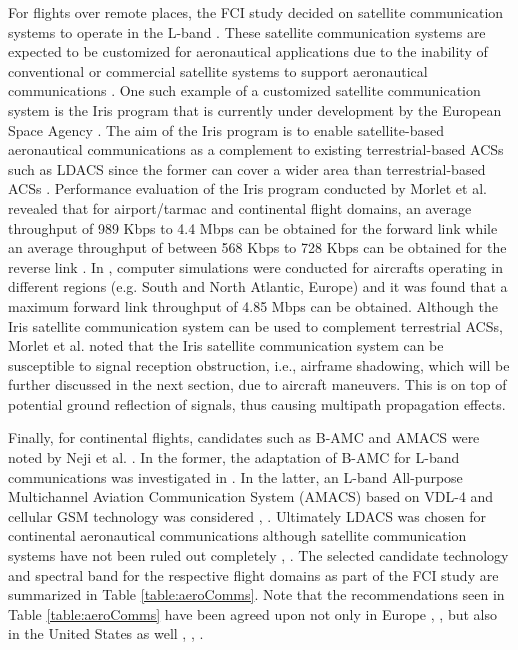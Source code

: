 For flights over remote places, the FCI study decided on satellite communication systems to operate in the L-band \cite{neji2013survey,morlet2011options}. These satellite communication systems are expected to be customized for aeronautical applications due to the inability of conventional or commercial satellite systems to support aeronautical communications \cite{neji2013survey}. One such example of a customized satellite communication system is the Iris program that is currently under development by the European Space Agency \cite{morlet2011options,morlet2010characterisation}. The aim of the Iris program is to enable satellite-based aeronautical communications as a complement to existing terrestrial-based ACSs such as LDACS since the former can cover a wider area than terrestrial-based ACSs \cite{morlet2011options}. Performance evaluation of the Iris program conducted by Morlet et al. \cite{morlet2010characterisation} revealed that for airport/tarmac and continental flight domains, an average throughput of 989 Kbps to 4.4 Mbps can be obtained for the forward link while an average throughput of between 568 Kbps to 728 Kbps can be obtained for the reverse link \cite{morlet2010characterisation}. In \cite{morlet2011options}, computer simulations were conducted for aircrafts operating in different regions (e.g. South and North Atlantic, Europe) and it was found that a maximum forward link throughput of 4.85 Mbps can be obtained. Although the Iris satellite communication system can be used to complement terrestrial ACSs, Morlet et al. \cite{morlet2011options} noted that the Iris satellite communication system can be susceptible to signal reception obstruction, i.e., airframe shadowing, which will be further discussed in the next section, due to aircraft maneuvers. This is on top of potential ground reflection of signals, thus causing multipath propagation effects.

Finally, for continental flights, candidates such as B-AMC and AMACS were noted by Neji et al. \cite{neji2013survey}. In the former, the adaptation of B-AMC for L-band communications was investigated in \cite{rokitansky2007bamc}. In the latter, an L-band All-purpose Multichannel Aviation Communication System (AMACS) based on VDL-4 and cellular GSM technology was considered \cite{eurocontrol2007amacs}, \cite{deneufchatel2007all}. Ultimately LDACS was chosen for continental aeronautical communications although satellite communication systems have not been ruled out completely \cite{neji2013survey}, \cite{fistas2009future}. The selected candidate technology and spectral band for the respective flight domains as part of the FCI study are summarized in Table \ref{table:aeroComms}. Note that the recommendations seen in Table \ref{table:aeroComms} have been agreed upon not only in Europe \cite{budinger2011aeronautical}, \cite{fistas2009future}, \cite{fistas2011future} but also in the United States as well \cite{wichgers2013study}, \cite{budinger2011aeronautical}, \cite{budinger2005technology}. 

